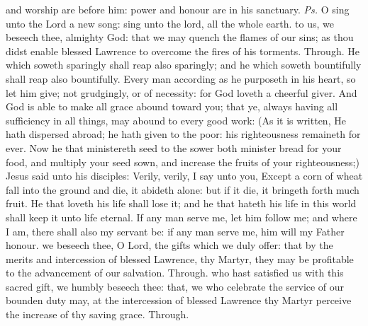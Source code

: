 \introit
{} and worship are before him: power and honour are in his sanctuary. \textit{Ps.} O sing unto the Lord a new song: sing unto the lord, all the whole earth.
\collect
{} to us, we beseech thee, almighty God: that we may quench the flames of our sins; as thou didst enable blessed Lawrence to overcome the fires of his torments. Through.
 He which soweth sparingly shall reap also sparingly; and he which soweth bountifully shall reap also bountifully. Every man according as he purposeth in his heart, so let him give; not grudgingly, or of necessity: for God loveth a cheerful giver. And God is able to make all grace abound toward you; that ye, always having all sufficiency in all things, may abound to every good work: (As it is written, He hath dispersed abroad; he hath given to the poor: his righteousness remaineth for ever. Now he that ministereth seed to the sower both minister bread for your food, and multiply your seed sown, and increase the fruits of your righteousness;)
 Jesus said unto his disciples: Verily, verily, I say unto you, Except a corn of wheat fall into the ground and die, it abideth alone: but if it die, it bringeth forth much fruit. He that loveth his life shall lose it; and he that hateth his life in this world shall keep it unto life eternal. If any man serve me, let him follow me; and where I am, there shall also my servant be: if any man serve me, him will my Father honour.
\secret
{} we beseech thee, O Lord, the gifts which we duly offer: that by the merits and intercession of blessed Lawrence, thy Martyr, they may be profitable to the advancement of our salvation. Through.
\postcommunion
{} who hast satisfied us with this sacred gift, we humbly beseech thee: that, we who celebrate the service of our bounden duty may, at the intercession of blessed Lawrence thy Martyr perceive the increase of thy saving grace. Through.


